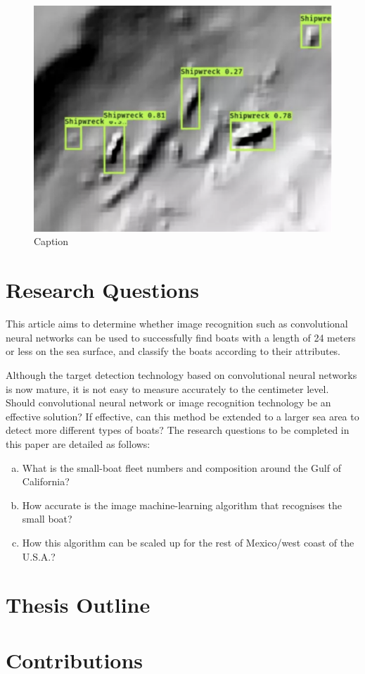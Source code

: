 \begin{figure}
    \centering
    \includegraphics[scale=0.5]{img/shipwrecks.png}
    \caption{Caption}
    \label{fig:shipwrecks}
\end{figure}


\section{Research Questions}
This article aims to determine whether image recognition such as convolutional neural networks can be used to successfully find boats with a length of 24 meters or less on the sea surface, and classify the boats according to their attributes.

Although the target detection technology based on convolutional neural networks is now mature, it is not easy to measure accurately to the centimeter level. Should convolutional neural network or image recognition technology be an effective solution? If effective, can this method be extended to a larger sea area to detect more different types of boats? The research questions to be completed in this paper are detailed as follows:

\begin{enumerate}[(a)]

    \item What is the small-boat fleet numbers and composition around the Gulf of California?
    
    \item How accurate is the image machine-learning algorithm that recognises the small boat?
    
    \item How this algorithm can be scaled up for the rest of Mexico/west coast of the U.S.A.?
\end{enumerate}

\section{Thesis Outline}


\section{Contributions}